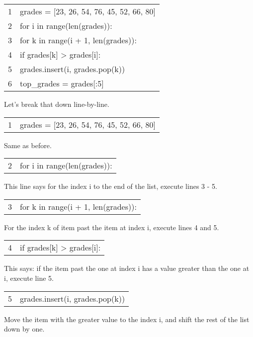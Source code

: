 \documentclass{article}
\newcommand{\icode}[1]{{\ttfamily #1}}
\newenvironment{code}{\begin{tcolorbox}\ttfamily}{\end{tcolorbox}}
\begin{document}
\begin{code}
	\begin{tabular}{l|l}
		1&grades = [23, 26, 54, 76, 45, 52, 66, 80]\\
		2&for i in range(len(grades)):\\
		3&\hspace{2 em}for k in range(i + 1, len(grades)):\\
		4&\hspace{4 em}if grades[k] > grades[i]:\\
		5& \hspace{6 em}grades.insert(i, grades.pop(k))\\
		6& top\_grades = grades[:5]
	\end{tabular}
\end{code}
\noindent Let's break that down line-by-line.
\vspace{.5 cm}

\begin{code}
	\begin{tabular}{l|l}
		1& grades = [23, 26, 54, 76, 45, 52, 66, 80]
	\end{tabular}
\end{code}
Same as before.

\begin{code}
	\begin{tabular}{l|l}
		2&for i in range(len(grades)):
	\end{tabular}
\end{code}
This line says for the index \icode{i} to the end of the list, execute lines 3 - 5.

\begin{code}
	\begin{tabular}{l|l}
		3&\hspace{2 em}for k in range(i + 1, len(grades)):
	\end{tabular}
\end{code}
For the index \icode{k} of item past the item at index \icode{i}, execute lines 4 and 5.

\begin{code}
	\begin{tabular}{l|l}
		4&\hspace{4 em}if grades[k] > grades[i]:
	\end{tabular}
\end{code}
This says: if the item past the one at index \icode{i} has a value greater than the one at \icode{i}, execute line 5.

\begin{code}
	\begin{tabular}{l|l}
		5& \hspace{6 em}grades.insert(i, grades.pop(k))
	\end{tabular}
\end{code}
Move the item with the greater value to the index \icode{i}, and shift the rest of the list down by one.
\end{document}
